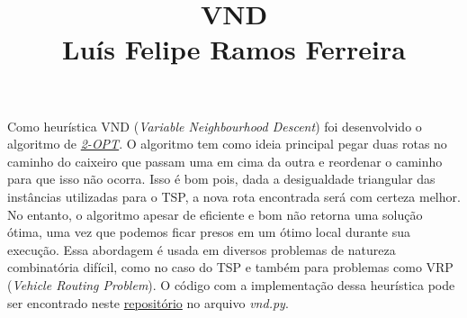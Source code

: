 \documentclass{article}
\title{\vspace{-3em} VND \\ Luís Felipe Ramos Ferreira \vspace{-3em}}
\date{}
\begin{document}
\maketitle

Como heurística VND (\textit{Variable Neighbourhood Descent}) foi desenvolvido o algoritmo de \href{https://en.wikipedia.org/wiki/2-opt}{\textit{2-OPT}}.
O algoritmo tem como ideia principal pegar duas rotas no caminho do caixeiro que passam uma em cima da outra e reordenar
o caminho para que isso não ocorra. Isso é bom pois, dada a desigualdade triangular das instâncias utilizadas para o TSP, a nova
rota encontrada será com certeza melhor. No entanto, o algoritmo apesar de eficiente e bom não retorna uma solução ótima,
uma vez que podemos ficar presos em um ótimo local durante sua execução. Essa abordagem é usada em diversos problemas de natureza combinatória difícil,
como no caso do TSP e também para problemas como VRP (\textit{Vehicle Routing Problem}). O código com a implementação
dessa heurística pode ser encontrado neste \href{https://github.com/lframosferreira/tsp-heuristics}{repositório} no arquivo \textit{vnd.py}.
\end{document}
